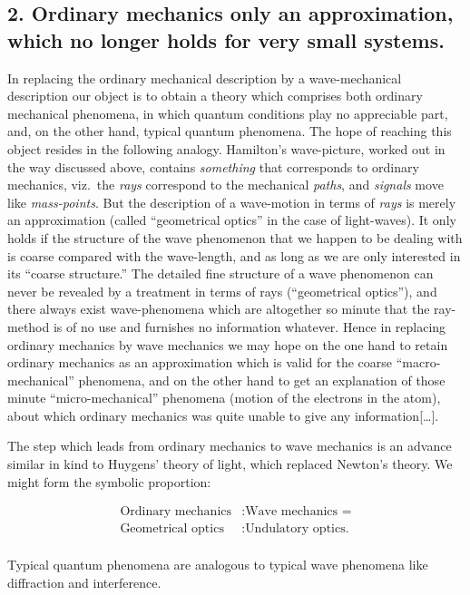 \subsection{2. Ordinary mechanics only an approximation, which no longer holds for
very small systems.}

In replacing the ordinary mechanical description by a wave-mechanical
description our object is to obtain a theory which comprises both
ordinary mechanical phenomena, in which quantum conditions play no
appreciable part, and, on the other hand, typical quantum phenomena. The
hope of reaching this object resides in the following analogy.
Hamilton's wave-picture, worked out in the way discussed above, contains
\emph{something} that corresponds to ordinary mechanics, viz.\ the
\emph{rays} correspond to the mechanical \emph{paths}, and
\emph{signals} move like \emph{mass-points}. But the description of a
wave-motion in terms of \emph{rays} is merely an approximation (called
``geometrical optics'' in the case of light-waves). It only holds if the
structure of the wave phenomenon that we happen to be dealing with is
coarse compared with the wave-length, and as long as we are only
interested in its ``coarse structure.'' The detailed fine structure of a
wave phenomenon can never be revealed by a treatment in terms of rays
(``geometrical optics''), and there always exist wave-phenomena which
are altogether so minute that the ray-method is of no use and furnishes
no information whatever. Hence in replacing ordinary mechanics by wave
mechanics we may hope on the one hand to retain ordinary mechanics as an
approximation which is valid for the coarse ``macro-mechanical''
phenomena, and on the other hand to get an explanation of those minute
``micro-mechanical'' phenomena (motion of the electrons in the atom),
about which ordinary mechanics was quite unable to give any information[\ldots].

The step which leads from ordinary mechanics to wave mechanics is an
advance similar in kind to Huygens' theory of light, which replaced
Newton's theory. We might form the symbolic proportion:
\begin{center}
\begin{align*}
\text{Ordinary mechanics} &: \text{Wave mechanics =}\\
\text{Geometrical optics} &: \text{Undulatory optics.}\\
\end{align*}
\end{center}
Typical quantum phenomena are analogous to typical wave phenomena like
diffraction and interference.

